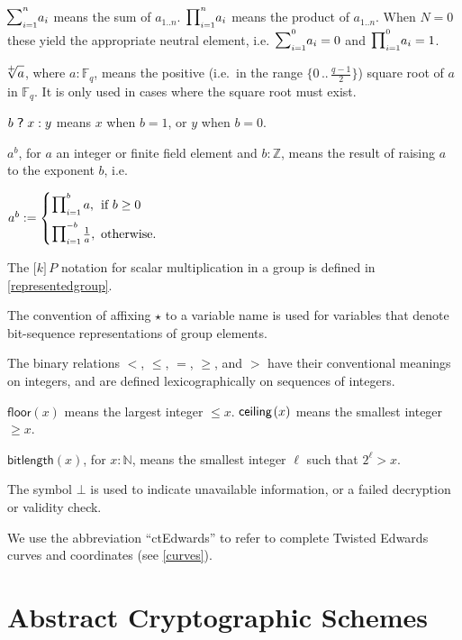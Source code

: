 \documentclass{article}
\newcommand{\crossref}[1]{\autoref{#1}}
\newcommand{\typecolon}{:}
\newcommand{\Nat}{\mathbb{N}}
\newcommand{\Int}{\mathbb{Z}}
\newcommand{\Field}[1]{\mathbb{F}_{\!#1}}
\newcommand{\squash}{\!\!\!}
\newcommand{\caseif}{\squash\text{if }}
\newcommand{\caseotherwise}{\squash\text{otherwise}}
\newcommand{\bitlength}{\mathsf{bitlength}}
\newcommand{\setof}[1]{\{{#1}\}}
\newcommand{\barerange}[2]{{{#1}\,..\,{#2}}}
\newcommand{\range}[2]{\setof{\barerange{#1}{#2}}}
\newcommand{\alln}{1..n}
\newcommand{\floor}[1]{\mathsf{floor}\!\left({#1}\right)}
\newcommand{\ceiling}[1]{\mathsf{ceiling}\kern-0.06em\left({#1}\right)}
\newcommand{\sop}[3]{\!\scalebox{0.89}{$\scalebox{1.404}{$\strut#3$}_{#1}^{#2}$}}
\newcommand{\ssum}[2]{\sop{#1}{#2}{\sum}}
\newcommand{\sproduct}[2]{\sop{#1}{#2}{\prod}}
\newcommand{\bchoose}{\;\scalebox{1.2}[1]{\textsf{?}}\;}
\newcommand{\scalarmult}[2]{\boldsymbol{[}{#1}\boldsymbol{]}\,{#2}}
\newcommand{\possqrt}[1]{\raisebox{0.3ex}{${}^+$}\hspace{-0.7em}\sqrt{#1\vphantom{b}}}
\newcommand{\Repr}{\star}
\begin{document}
$\!\ssum{i=1}{n} a_i$ means the sum of $a_{\alln{}}$.
$\sproduct{i=1}{n} a_i$ means the product of $a_{\alln{}}$.
When $N = 0$ these yield the appropriate neutral element, i.e.
$\ssum{i=1}{0} a_i = 0$ and $\sproduct{i=1}{0} a_i = 1$.

$\possqrt{a}$, where $a \typecolon \Field{q}$, means the positive
(i.e.\ in the range $\range{0}{\frac{q-1}{2}}$)
square root of $a$ in $\Field{q}$. It is only used in cases where the
square root must exist.

$b \bchoose x : y$ means $x$ when $b = 1$, or $y$ when $b = 0$.

$a^b$, for $a$ an integer or finite field element and
$b \typecolon \Int$, means the result of raising $a$ to the exponent $b$,
i.e.
\begin{formulae}
  \item $a^b := \begin{cases}
          \sproduct{i=1}{b}  \kern 0.15em a, &\caseif b \geq 0 \\[1.5ex]
          \sproduct{i=1}{-b} \kern 0.1em \frac{1}{a}, &\caseotherwise.
        \end{cases}$
\end{formulae}

The $\scalarmult{k}{P}$ notation for scalar multiplication in a group is
defined in \crossref{representedgroup}.

The convention of affixing $\Repr$ to a variable name is used
for variables that denote bit-sequence representations of group elements.

The binary relations $<$, $\leq$, $=$, $\geq$, and $>$ have their conventional
meanings on integers, and are defined lexicographically on sequences of integers.

$\floor{x}$ means the largest integer $\leq x$.
$\ceiling{x}$ means the smallest integer $\geq x$.

$\bitlength(x)$, for $x \typecolon \Nat$, means the smallest integer
$\ell$ such that $2^\ell > x$.

The symbol $\bot$ is used to indicate unavailable information, or a failed
decryption or validity check.

We use the abbreviation ``ctEdwards'' to refer to complete Twisted Edwards curves
and coordinates (see \crossref{curves}).


\section{Abstract Cryptographic Schemes} \label{schemes}
\end{document}
